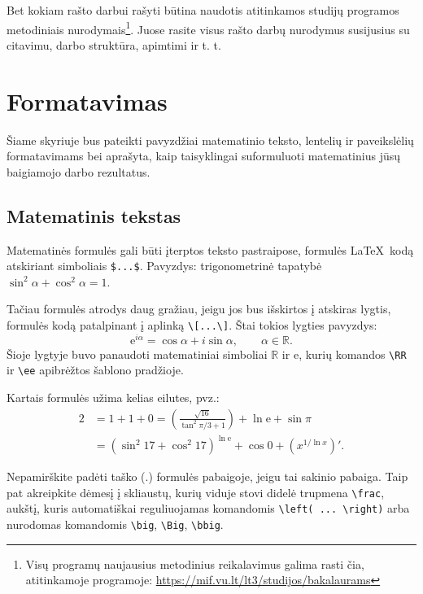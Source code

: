 \documentclass[]{VUMIFTemplateClass}
\newcommand{\ee}{{\mathrm e}}  %
\newcommand{\RR}{\mathbb{R}}
\begin{document}
Bet kokiam rašto darbui rašyti būtina naudotis atitinkamos studijų programos metodiniais nurodymais\footnote{Visų programų naujausius metodinius reikalavimus galima rasti čia, atitinkamoje programoje: \url{https://mif.vu.lt/lt3/studijos/bakalaurams}}. Juose rasite visus rašto darbų nurodymus susijusius su citavimu, darbo struktūra, apimtimi ir t. t.


\section{Formatavimas}

Šiame skyriuje bus pateikti pavyzdžiai matematinio teksto, lentelių ir paveikslėlių formatavimams bei aprašyta, kaip taisyklingai suformuluoti matematinius jūsų baigiamojo darbo rezultatus.

\subsection{Matematinis tekstas}

Matematinės formulės gali būti įterptos teksto pastraipose, formulės \LaTeX~kodą atskiriant simboliais \texttt{\$...\$}. Pavyzdys: trigonometrinė tapatybė $\sin^2 \alpha + \cos^2 \alpha = 1$.

Tačiau formulės atrodys daug gražiau, jeigu jos bus išskirtos į atskiras lygtis, formulės kodą patalpinant į aplinką \texttt{\textbackslash[...\textbackslash]}. Štai tokios lygties pavyzdys:
\[
\ee^{i \alpha} = \cos{\alpha} + i \sin{\alpha}, \qquad \alpha \in \RR.
\]
Šioje lygtyje buvo panaudoti matematiniai simboliai $\RR$ ir $\ee$, kurių komandos \texttt{\textbackslash RR} ir \texttt{\textbackslash ee} apibrėžtos šablono pradžioje.

Kartais formulės užima kelias eilutes, pvz.:
\begin{equation}
\begin{split}
2&= 1+1+0=\left(\frac{\sqrt{16}}{\tan^2\pi/3+1}\right) +\ln\ee+\sin\pi\\
&= (\sin^2 17+\cos^2 17)^{\ln\ee}+\cos 0 +(x^{1/\ln x})'. 
\label{form1}
\end{split}
\end{equation}

Nepamirškite padėti taško ($.$) formulės pabaigoje, jeigu tai sakinio pabaiga. Taip pat akreipkite dėmesį į skliaustų, kurių viduje stovi didelė trupmena \texttt{\textbackslash frac}, aukštį, kuris automatiškai reguliuojamas komandomis \texttt{\textbackslash left( ... \textbackslash right)} arba nurodomas komandomis \texttt{\textbackslash big}, \texttt{\textbackslash Big}, \texttt{\textbackslash bbig}.
\end{document}
